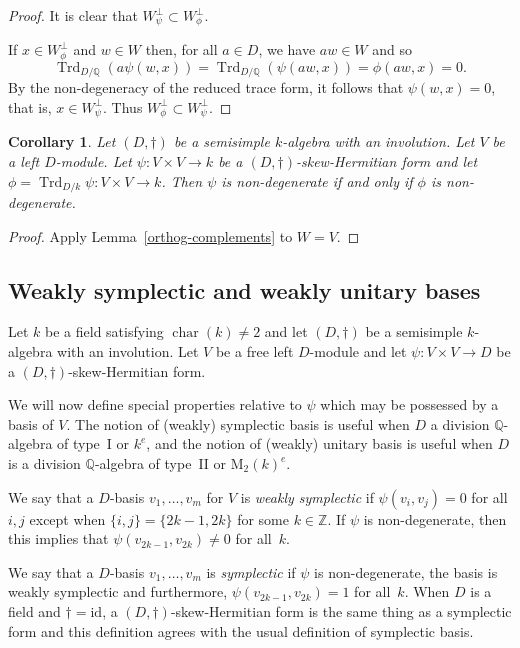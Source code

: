 \documentclass[JEP,XML,SOM,Unicode,NoFloatCountersInSection]{cedram}
\newcommand{\bQ}{\mathbb{Q}}
\newcommand{\bZ}{\mathbb{Z}}
\newcommand{\rM}{\mathrm{M}}
\DeclareMathOperator{\characteristic}{char}
\DeclareMathOperator{\Trd}{Trd}
\newcommand{\id}{\mathrm{id}}
\newcommand{\defterm}[1]{\emph{#1}}
\newtheorem{corollary}[lemma]{Corollary}
\begin{document}
\begin{proof}
It is clear that $W_\psi^\perp \subset W_\phi^\perp$.

If $x \in W_\phi^\perp$ and $w \in W$ then, for all $a \in D$, we have $aw \in W$ and so
\[
\Trd_{D/\bQ}(a\psi(w,x)) = \Trd_{D/\bQ}(\psi(aw,x)) = \phi(aw,x) = 0.
\]
By the non-degeneracy of the reduced trace form, it follows that $\psi(w,x) = 0$, that is, $x \in W_\psi^\perp$.
Thus $W_\phi^\perp \subset W_\psi^\perp$.
\end{proof}

\begin{corollary} \label{tr-non-deg}
Let $(D, \dag)$ be a semisimple $k$-algebra with an involution.
Let $V$ be a left $D$-module.
Let $\psi \colon V \times V \to k$ be a $(D,\dag)$-skew-Hermitian form and let $\phi = \Trd_{D/k} \psi \colon V \times V \to k$.
Then $\psi$ is non-degenerate if and only if $\phi$ is non-degenerate.
\end{corollary}

\begin{proof}
Apply Lemma~\ref{orthog-complements} to $W = V$.
\end{proof}

\subsection{Weakly symplectic and weakly unitary bases} \label{subsec:unitary-bases}

Let $k$ be a field satisfying $\characteristic(k) \neq 2$ and let $(D,\dag)$ be a semisimple $k$-algebra with an involution.
Let $V$ be a free left $D$-module and let $\psi \colon V \times V \to D$ be a $(D,\dag)$-skew-Hermitian form.

We will now define special properties relative to $\psi$ which may be possessed by a basis of $V$. The notion of (weakly) symplectic basis is useful when $D$ a division $\bQ$\nobreakdash-al\-gebra of type~I or $k^e$, and the notion of (weakly) unitary basis is useful when $D$ is a division $\bQ$-algebra of type~II or $\rM_2(k)^e$.

We say that a $D$-basis $v_1, \dotsc, v_m$ for $V$ is \defterm{weakly symplectic} if $\psi(v_i, v_j) = 0$ for all $i, j$ except when $\{i,j\} = \{2k-1,2k\}$ for some $k \in \bZ$.
If $\psi$ is non-degenerate, then this implies that $\psi(v_{2k-1}, v_{2k}) \neq 0$ for all~$k$.

We say that a $D$-basis $v_1, \dotsc, v_m$ is \defterm{symplectic} if $\psi$ is non-degenerate, the basis is weakly symplectic and furthermore, $\psi(v_{2k-1}, v_{2k}) = 1$ for all~$k$.
When $D$ is a field and $\dag=\id$, a $(D,\dag)$-skew-Hermitian form is the same thing as a symplectic form and this definition agrees with the usual definition of symplectic basis.
\end{document}
